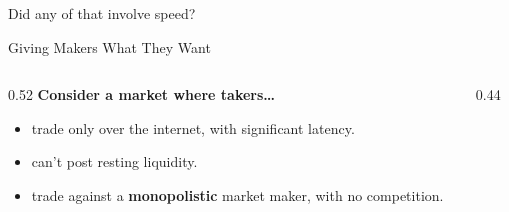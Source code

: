 \documentclass[aspectratio=169]{beamer}
\begin{document}
\begin{frame}[standout]
  Did any of that involve speed?
\end{frame}

\begin{frame}{Giving Makers What They Want}
  \begin{columns}[T]
    \begin{column}{0.52\textwidth}
      \textbf{Consider a market where takers\ldots}
      \vspace{0.6em}
      \begin{itemize}
        \item<1-> trade only over the internet, with significant latency.
        \item<2-> can't post resting liquidity.
        \item<3-> trade against a \textbf{monopolistic} market maker,
                  with no competition.
      \end{itemize}
    \end{column}
    \begin{column}{0.44\textwidth}
      \vspace{1.6em}
      \centering
    \end{column}
  \end{columns}
\end{frame}
\end{document}
